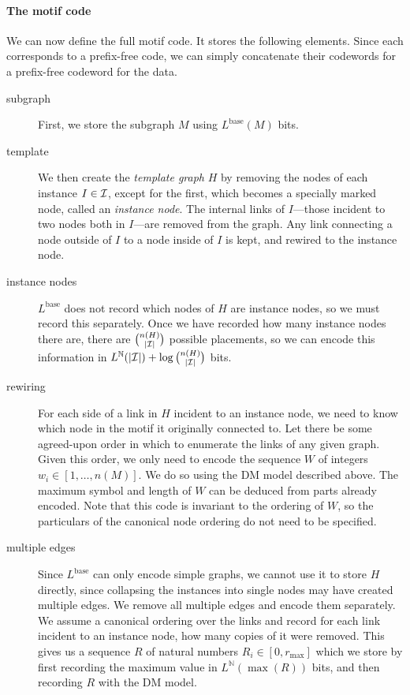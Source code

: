 \documentclass[twoside,11pt]{article}
\newcommand{\N}{{\mathbb N}}
\begin{document}
\paragraph{The motif code} We can now define the full motif code. It stores the following elements. Since each corresponds to a prefix-free code, we can simply concatenate their codewords for a prefix-free codeword for the data.
\begin{description}
\item[subgraph] First, we store the subgraph $M$ using $L^\text{base}(M)$ bits.
\item[template] We then create the \emph{template graph} $H$ by removing the nodes of each instance $I \in \cal I$, except for the first, which becomes a specially marked node, called an \emph{instance node}. The internal links of $I$---those incident to two nodes both in $I$---are removed from the graph. Any link connecting a node outside of $I$ to a node inside of $I$ is kept, and rewired to the instance node.
\item[instance nodes] $L^\text{base}$ does not record which nodes of $H$ are instance nodes, so we must record this separately. Once we have recorded how many instance nodes there are, there are $n(H) \choose |{\cal I}|$ possible placements, so we can encode this information in $L^\N (|{\cal I}|) + \log {n(H) \choose |{\cal I}|}$ bits. 
\item[rewiring] For each side of a link in $H$ incident to an instance node, we need to know which node in the motif it originally connected to. Let there be some agreed-upon order in which to enumerate the links of any given graph. Given this order, we only need to encode the sequence $W$ of integers $w_i \in [1,\ldots, n(M)]$. We do so using the DM model described above. The maximum symbol and length of $W$ can be deduced from parts already encoded. Note that this code is invariant to the ordering of $W$, so the particulars of the canonical node ordering do not need to be specified.
\item[multiple edges] Since $L^\text{base}$ can only encode simple graphs, we cannot use it to store $H$ directly, since collapsing the instances into single nodes may have created multiple edges. We remove all multiple edges and encode them separately. We assume a canonical ordering over the links and record for each link incident to an instance node, how many copies of it were removed. This gives us a sequence $R$ of natural numbers $R_i \in [0, r_\text{max}]$ which we store by first recording the maximum value in $L^\N(\max(R))$ bits, and then recording $R$ with the DM model.

\end{description}
\end{document}
